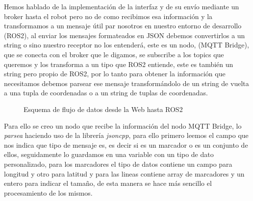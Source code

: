 Hemos hablado de la implementación de la interfaz y de su envío mediante un broker hasta el robot pero no de como recibimos esa información 
y la transformamos a un mensaje útil par nosotros en nuestro entorno de desarrollo (ROS2), al enviar los mensajes formateados en JSON 
debemos convertirlos a un string o sino nuestro receptor no los entenderá, este es un nodo, (MQTT Bridge), que se conecta con el broker 
que le digamos, se subscribe a los topics que queremos y los transforma a un tipo que ROS2 entiende, este es también un string pero propio 
de ROS2, por lo  tanto para obtener la información que necesitamos debemos parsear ese mensaje transformándolo de un string de vuelta a una 
tupla de coordenadas o a un string de tuplas de coordenadas.
\begin{figure}[h]
\begin{center}
\end{center}
\caption{Esquema de flujo de datos desde la Web hasta ROS2}
\label{fig:esquema_flujo_datos}
\end{figure}

\newpage
Para ello se creo un nodo que recibe la información del nodo MQTT Bridge, 
lo \textit{parsea} haciendo uso de la librería \textit{jsoncpp}, para ello primero leemos el campo que nos indica que tipo de mensaje es, es 
decir si es un marcador o es un conjunto de ellos, seguidamente lo guardamos en una variable con un tipo de dato personalizado, para los 
marcadores el tipo de datos contiene un campo para longitud y otro para latitud y para las lineas contiene array de marcadores y un entero 
para indicar el tamaño, de esta manera se hace más sencillo el procesamiento de los mismos.



